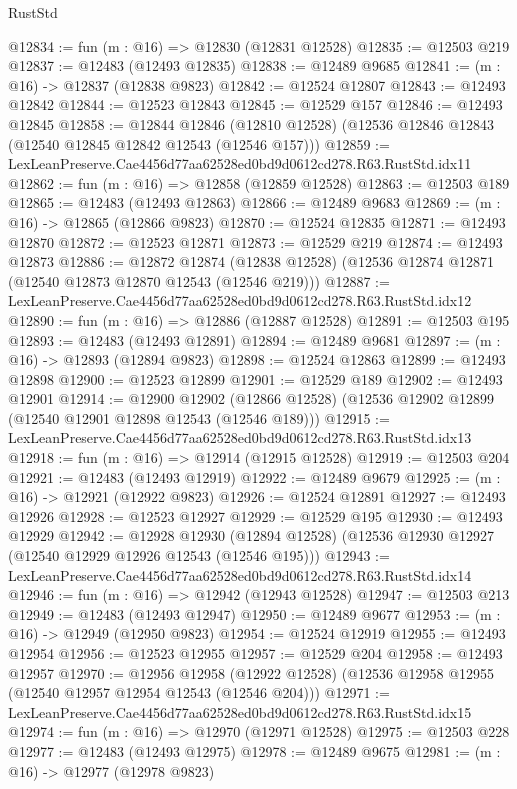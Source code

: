 \begin{lexlean}{RustStd}
\begin{coremodule}
@12834 := fun (m : @16) => @12830 (@12831 @12528)
@12835 := @12503 @219
@12837 := @12483 (@12493 @12835)
@12838 := @12489 @9685
@12841 := (m : @16) -> @12837 (@12838 @9823)
@12842 := @12524 @12807
@12843 := @12493 @12842
@12844 := @12523 @12843
@12845 := @12529 @157
@12846 := @12493 @12845
@12858 := @12844
    @12846
    (@12810 @12528)
    (@12536 @12846 @12843 (@12540 @12845 @12842 @12543 (@12546 @157)))
@12859 := LexLeanPreserve.Cae4456d77aa62528ed0bd9d0612cd278.R63.RustStd.idx11
@12862 := fun (m : @16) => @12858 (@12859 @12528)
@12863 := @12503 @189
@12865 := @12483 (@12493 @12863)
@12866 := @12489 @9683
@12869 := (m : @16) -> @12865 (@12866 @9823)
@12870 := @12524 @12835
@12871 := @12493 @12870
@12872 := @12523 @12871
@12873 := @12529 @219
@12874 := @12493 @12873
@12886 := @12872
    @12874
    (@12838 @12528)
    (@12536 @12874 @12871 (@12540 @12873 @12870 @12543 (@12546 @219)))
@12887 := LexLeanPreserve.Cae4456d77aa62528ed0bd9d0612cd278.R63.RustStd.idx12
@12890 := fun (m : @16) => @12886 (@12887 @12528)
@12891 := @12503 @195
@12893 := @12483 (@12493 @12891)
@12894 := @12489 @9681
@12897 := (m : @16) -> @12893 (@12894 @9823)
@12898 := @12524 @12863
@12899 := @12493 @12898
@12900 := @12523 @12899
@12901 := @12529 @189
@12902 := @12493 @12901
@12914 := @12900
    @12902
    (@12866 @12528)
    (@12536 @12902 @12899 (@12540 @12901 @12898 @12543 (@12546 @189)))
@12915 := LexLeanPreserve.Cae4456d77aa62528ed0bd9d0612cd278.R63.RustStd.idx13
@12918 := fun (m : @16) => @12914 (@12915 @12528)
@12919 := @12503 @204
@12921 := @12483 (@12493 @12919)
@12922 := @12489 @9679
@12925 := (m : @16) -> @12921 (@12922 @9823)
@12926 := @12524 @12891
@12927 := @12493 @12926
@12928 := @12523 @12927
@12929 := @12529 @195
@12930 := @12493 @12929
@12942 := @12928
    @12930
    (@12894 @12528)
    (@12536 @12930 @12927 (@12540 @12929 @12926 @12543 (@12546 @195)))
@12943 := LexLeanPreserve.Cae4456d77aa62528ed0bd9d0612cd278.R63.RustStd.idx14
@12946 := fun (m : @16) => @12942 (@12943 @12528)
@12947 := @12503 @213
@12949 := @12483 (@12493 @12947)
@12950 := @12489 @9677
@12953 := (m : @16) -> @12949 (@12950 @9823)
@12954 := @12524 @12919
@12955 := @12493 @12954
@12956 := @12523 @12955
@12957 := @12529 @204
@12958 := @12493 @12957
@12970 := @12956
    @12958
    (@12922 @12528)
    (@12536 @12958 @12955 (@12540 @12957 @12954 @12543 (@12546 @204)))
@12971 := LexLeanPreserve.Cae4456d77aa62528ed0bd9d0612cd278.R63.RustStd.idx15
@12974 := fun (m : @16) => @12970 (@12971 @12528)
@12975 := @12503 @228
@12977 := @12483 (@12493 @12975)
@12978 := @12489 @9675
@12981 := (m : @16) -> @12977 (@12978 @9823)

\end{coremodule}
\end{lexlean}
